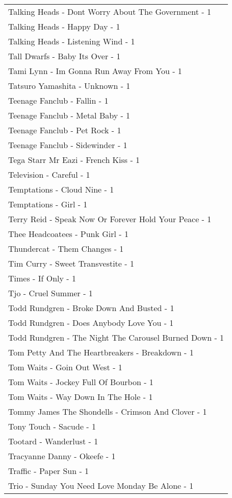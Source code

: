 \documentclass[
]{article}
\begin{document}
\begin{longtable}{l}
Talking Heads - Dont Worry About The Government - 1 \\ 
Talking Heads - Happy Day - 1 \\ 
Talking Heads - Listening Wind - 1 \\ 
Tall Dwarfs - Baby Its Over - 1 \\ 
Tami Lynn - Im Gonna Run Away From You - 1 \\ 
Tatsuro Yamashita - Unknown - 1 \\ 
Teenage Fanclub - Fallin - 1 \\ 
Teenage Fanclub - Metal Baby - 1 \\ 
Teenage Fanclub - Pet Rock - 1 \\ 
Teenage Fanclub - Sidewinder - 1 \\ 
Tega Starr Mr Eazi - French Kiss - 1 \\ 
Television - Careful - 1 \\ 
Temptations - Cloud Nine - 1 \\ 
Temptations - Girl - 1 \\ 
Terry Reid - Speak Now Or Forever Hold Your Peace - 1 \\ 
Thee Headcoatees - Punk Girl - 1 \\ 
Thundercat - Them Changes - 1 \\ 
Tim Curry - Sweet Transvestite - 1 \\ 
Times - If Only - 1 \\ 
Tjo - Cruel Summer - 1 \\ 
Todd Rundgren - Broke Down And Busted - 1 \\ 
Todd Rundgren - Does Anybody Love You - 1 \\ 
Todd Rundgren - The Night The Carousel Burned Down - 1 \\ 
Tom Petty And The Heartbreakers - Breakdown - 1 \\ 
Tom Waits - Goin Out West - 1 \\ 
Tom Waits - Jockey Full Of Bourbon - 1 \\ 
Tom Waits - Way Down In The Hole - 1 \\ 
Tommy James The Shondells - Crimson And Clover - 1 \\ 
Tony Touch - Sacude - 1 \\ 
Tootard - Wanderlust - 1 \\ 
Tracyanne Danny - Okeefe - 1 \\ 
Traffic - Paper Sun - 1 \\ 
Trio - Sunday You Need Love Monday Be Alone - 1 \\ 

\end{longtable}
\end{document}
